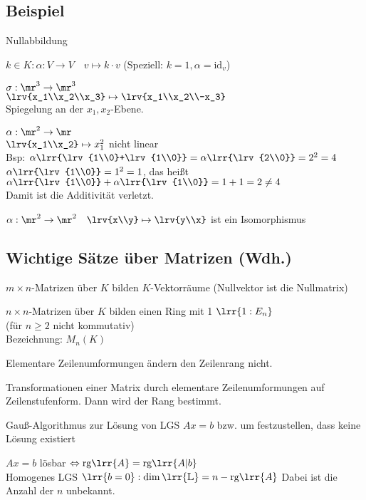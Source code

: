 \subsection{Beispiel}
		\item Nullabbildung
		\item $k\in K:\alpha:V\rightarrow V\quad v\mapsto k\cdot v$ (Speziell: $k=1,\alpha =\mbox{id}_v$)
		\item $\sigma:\mr^3\rightarrow\mr^3$\\
			$\lrv{x_1\\x_2\\x_3}\mapsto\lrv{x_1\\x_2\\-x_3}$\\
			Spiegelung an der $x_1,x_2$-Ebene.
		\item $\alpha:\mr^2\rightarrow\mr$\\
			$\lrv{x_1\\x_2}\mapsto x_1^2$ nicht linear\\
			Bsp: $\alpha\lrr{\lrv{1\\0}+\lrv{1\\0}}=\alpha\lrr{\lrv{2\\0}}=2^2=4$\\
			$\alpha\lrr{\lrv{1\\0}}=1^2=1$, das heißt $\alpha\lrr{\lrv{1\\0}}+\alpha\lrr{\lrv{1\\0}}=1+1=2\neq 4$\\
			Damit ist die Additivität verletzt.
		\item $\alpha:\mr^2\rightarrow\mr^2\quad \lrv{x\\y}\mapsto\lrv{y\\x}$ ist ein Isomorphismus
	\subExEnd

\subsection{Wichtige Sätze über Matrizen (Wdh.)}
		\item $m\times n$-Matrizen über $K$ bilden $K$-Vektorräume (Nullvektor ist die Nullmatrix)
		\item $n\times n$-Matrizen über $K$ bilden einen Ring mit 1 $\lrr{1:E_n}$\\
			(für $n\geq 2$ nicht kommutativ)\\
			Bezeichnung: $M_n(K)$
		\item Elementare Zeilenumformungen ändern den Zeilenrang nicht.
		\item Transformationen einer Matrix durch elementare Zeilenumformungen auf Zeilenstufenform. Dann wird der Rang bestimmt.
		\item Gauß-Algorithmus zur Lösung von LGS $Ax=b$ bzw. um festzustellen, dass keine Lösung existiert
		\item $Ax=b$ lösbar $\Leftrightarrow\mbox{rg}\lrr{A}=\mbox{rg}\lrr{A|b}$\\
			Homogenes LGS $\lrr{b=0}:\dim\lrr{\mathbb{L}}=n-\mbox{rg}\lrr{A}$ Dabei ist die Anzahl der $n$ unbekannt.
	\subExEnd

